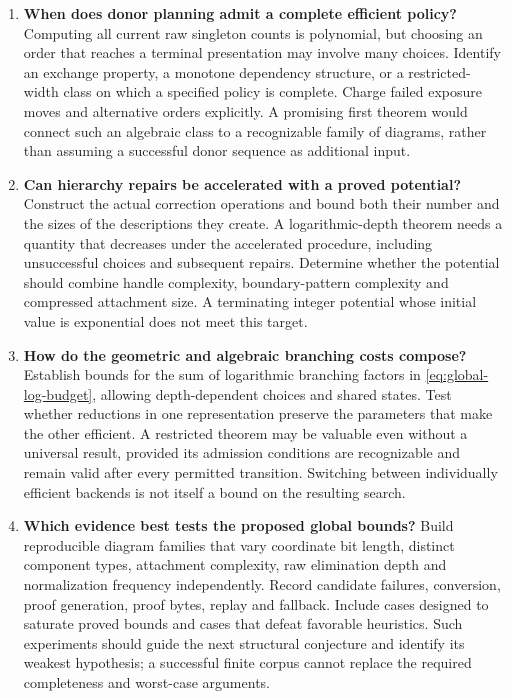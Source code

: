 \begin{enumerate}
\item \textbf{When does donor planning admit a complete efficient policy?}
Computing all current raw singleton counts is polynomial, but choosing
an order that reaches a terminal presentation may involve many choices.
Identify an exchange property, a monotone dependency structure, or a
restricted-width class on which a specified policy is complete. Charge
failed exposure moves and alternative orders explicitly. A promising
first theorem would connect such an algebraic class to a recognizable
family of diagrams, rather than assuming a successful donor sequence
as additional input.

\item \textbf{Can hierarchy repairs be accelerated with a proved potential?}
Construct the actual correction operations and bound both their number
and the sizes of the descriptions they create. A logarithmic-depth
theorem needs a quantity that decreases under the accelerated procedure,
including unsuccessful choices and subsequent repairs. Determine whether
the potential should combine handle complexity, boundary-pattern
complexity and compressed attachment size. A terminating integer
potential whose initial value is exponential does not meet this target.

\item \textbf{How do the geometric and algebraic branching costs compose?}
Establish bounds for the sum of logarithmic branching factors in
\eqref{eq:global-log-budget}, allowing depth-dependent choices and shared
states. Test whether reductions in one representation preserve the
parameters that make the other efficient. A restricted theorem may be
valuable even without a universal result, provided its admission
conditions are recognizable and remain valid after every permitted
transition. Switching between individually efficient backends is not
itself a bound on the resulting search.

\item \textbf{Which evidence best tests the proposed global bounds?}
Build reproducible diagram families that vary coordinate bit length,
distinct component types, attachment complexity, raw elimination depth
and normalization frequency independently. Record candidate failures,
conversion, proof generation, proof bytes, replay and fallback. Include
cases designed to saturate proved bounds and cases that defeat favorable
heuristics. Such experiments should guide the next structural conjecture
and identify its weakest hypothesis; a successful finite corpus cannot
replace the required completeness and worst-case arguments.
\end{enumerate}

